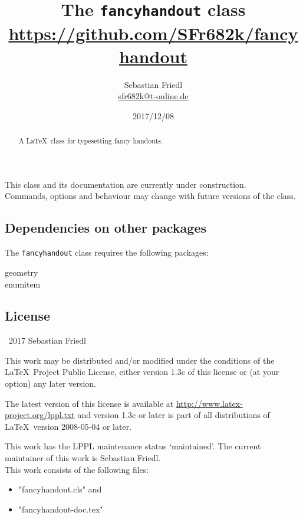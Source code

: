 \documentclass[11pt]{ltxdoc}
\title{The \texttt{fancyhandout} class \\ {\large\url{https://github.com/SFr682k/fancyhandout}}}
\author{Sebastian Friedl \\ \href{mailto:sfr682k@t-online.de}{\ttfamily sfr682k@t-online.de}}
\date{2017/12/08}
\begin{document}
	\maketitle
	
	\begin{abstract}
		\noindent%
		A \LaTeX\ class for typesetting fancy handouts.
	\end{abstract}
	
	This class and its documentation are currently under construction. \\
	Commands, options and behaviour may change with future versions of the class.
	
	\tableofcontents
	\clearpage
	
	
	
	\subsection*{Dependencies on other packages}
	The \texttt{fancyhandout} class requires the following packages:
	\begin{multicols}{3}\ttfamily\centering
		geometry \\ enumitem
	\end{multicols}
	
	\subsection*{License}
	\begin{small}
		\textcopyright\ 2017 Sebastian Friedl
		
		\smallskip
		This work may be distributed and/or modified under the conditions of the \LaTeX\ Project Public License, either version 1.3c of this license or (at your option) any later version.
		
		\smallskip
		The latest version of this license is available at \url{http://www.latex-project.org/lppl.txt} and version 1.3c or later is part of all distributions of \LaTeX\ version 2008-05-04 or later.
		
		\smallskip
		This work has the LPPL maintenance status \enquote*{maintained}. The current maintainer of this work is Sebastian Friedl. \\
		This work consists of the following files:
		\begin{itemize} \itemsep 0pt
			\item "fancyhandout.cls" and
			\item "fancyhandout-doc.tex"
		\end{itemize}
	\end{small}
\end{document}
